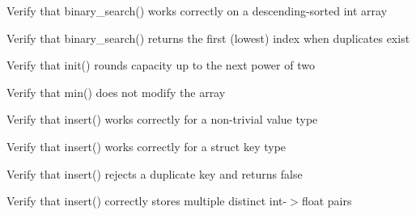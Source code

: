 \begin{DoxyRefList}
%
Verify that binary\+\_\+search() works correctly on a descending-\/sorted int array  
\item[Global \doxylink{test__array_8cpp_aa3928dc42392d783e4cd7d276f34b7dc}{TEST\+\_\+F} (\doxylink{classArrayInitTest}{Array\+Init\+Test}, Binary\+Search\+Int\+Returns\+First\+Duplicate)]\label{test__test000192}%
%
Verify that binary\+\_\+search() returns the first (lowest) index when duplicates exist  
\item[Global \doxylink{test__dict_8cpp_a30581c7a7568bdaa47fc9c997593107f}{TEST\+\_\+F} (\doxylink{classDictTest}{Dict\+Test}, Init\+Capacity\+Rounds\+Up\+To\+Power\+Of\+Two)]\label{test__test000215}%
%
Verify that init() rounds capacity up to the next power of two  
\item[Global \doxylink{test__array_8cpp_a186a2314918083054ef928045a1ad145}{TEST\+\_\+F} (\doxylink{classArrayInitTest}{Array\+Init\+Test}, Min\+Float\+Does\+Not\+Modify\+Array)]\label{test__test000152}%
%
Verify that min() does not modify the array  
\item[Global \doxylink{test__dict_8cpp_ab9a41b73c72937b90b18333e0bc71249}{TEST\+\_\+F} (\doxylink{classDictTest}{Dict\+Test}, Insert\+Non\+Trivial\+Value\+Succeeds)]\label{test__test000223}%
%
Verify that insert() works correctly for a non-\/trivial value type  
\item[Global \doxylink{test__dict_8cpp_a7aa515955d4b01220653cda3b35e8b6f}{TEST\+\_\+F} (\doxylink{classDictTest}{Dict\+Test}, Insert\+Struct\+Key\+Succeeds)]\label{test__test000222}%
%
Verify that insert() works correctly for a struct key type  
\item[Global \doxylink{test__dict_8cpp_ac9fa513f9aa248da0a711b7b3f6f0016}{TEST\+\_\+F} (\doxylink{classDictTest}{Dict\+Test}, Insert\+Duplicate\+Key\+Returns\+False)]\label{test__test000221}%
%
Verify that insert() rejects a duplicate key and returns false  
\item[Global \doxylink{test__dict_8cpp_acd8fc7a4e52efa822e3c0743cabdf58d}{TEST\+\_\+F} (\doxylink{classDictTest}{Dict\+Test}, Insert\+Multiple\+Int\+Float\+Pairs)]\label{test__test000220}%
%
Verify that insert() correctly stores multiple distinct int-\/\texorpdfstring{$>$}{>}float pairs  
\item[Global \doxylink{test__dict_8cpp_a0fd6ba8aaaac34316d91f61fc7b9db9d}{TEST\+\_\+F} (\doxylink{classDictTest}{Dict\+Test}, Insert\+Int\+Float\+Succeeds)]\label{test__test000219}%

\end{DoxyRefList}
